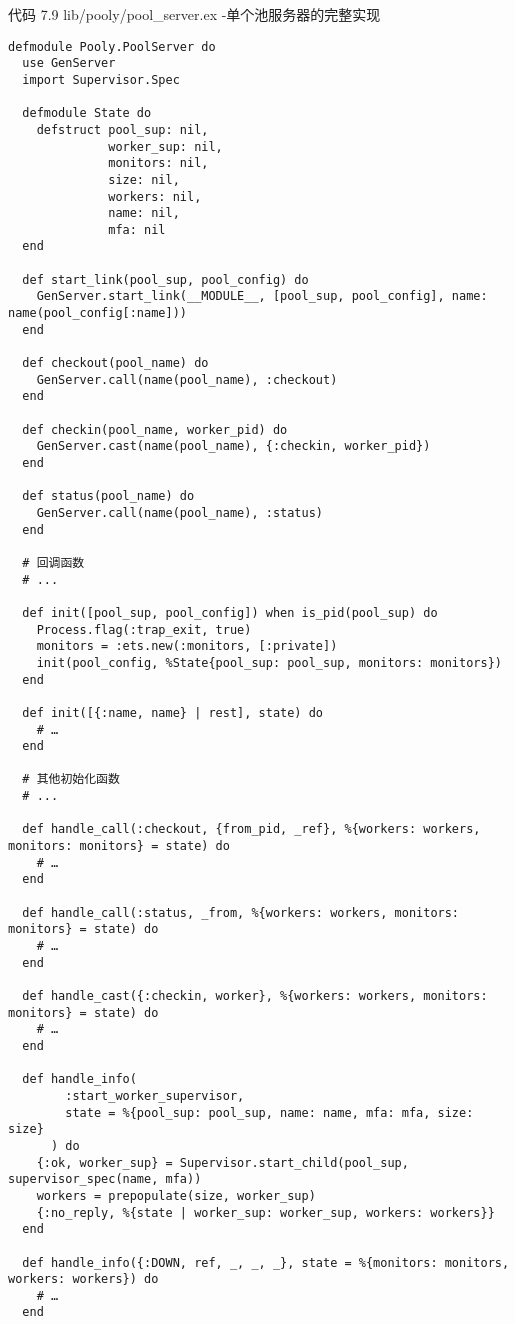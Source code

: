 \begin{code}{代码 7.9 lib/pooly/pool\_server.ex -单个池服务器的完整实现}

\begin{verbatim}
defmodule Pooly.PoolServer do
  use GenServer
  import Supervisor.Spec

  defmodule State do
    defstruct pool_sup: nil,
              worker_sup: nil,
              monitors: nil,
              size: nil,
              workers: nil,
              name: nil,
              mfa: nil
  end

  def start_link(pool_sup, pool_config) do
    GenServer.start_link(__MODULE__, [pool_sup, pool_config], name: name(pool_config[:name]))
  end

  def checkout(pool_name) do
    GenServer.call(name(pool_name), :checkout)
  end

  def checkin(pool_name, worker_pid) do
    GenServer.cast(name(pool_name), {:checkin, worker_pid})
  end

  def status(pool_name) do
    GenServer.call(name(pool_name), :status)
  end

  # 回调函数
  # ...

  def init([pool_sup, pool_config]) when is_pid(pool_sup) do
    Process.flag(:trap_exit, true)
    monitors = :ets.new(:monitors, [:private])
    init(pool_config, %State{pool_sup: pool_sup, monitors: monitors})
  end

  def init([{:name, name} | rest], state) do
    # …
  end

  # 其他初始化函数
  # ...

  def handle_call(:checkout, {from_pid, _ref}, %{workers: workers, monitors: monitors} = state) do
    # …
  end

  def handle_call(:status, _from, %{workers: workers, monitors: monitors} = state) do
    # …
  end

  def handle_cast({:checkin, worker}, %{workers: workers, monitors: monitors} = state) do
    # …
  end

  def handle_info(
        :start_worker_supervisor,
        state = %{pool_sup: pool_sup, name: name, mfa: mfa, size: size}
      ) do
    {:ok, worker_sup} = Supervisor.start_child(pool_sup, supervisor_spec(name, mfa))
    workers = prepopulate(size, worker_sup)
    {:no_reply, %{state | worker_sup: worker_sup, workers: workers}}
  end

  def handle_info({:DOWN, ref, _, _, _}, state = %{monitors: monitors, workers: workers}) do
    # …
  end


\end{verbatim}
\end{code}
